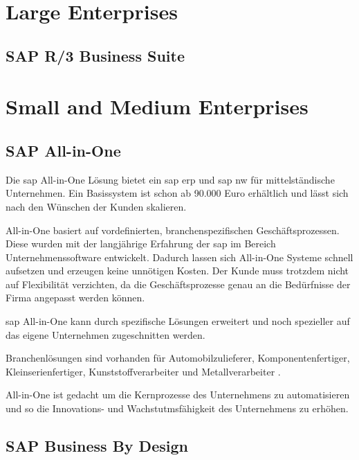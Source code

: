 \section{Large Enterprises}
\subsection{SAP R/3 Business Suite}
\label{sec:business-suite}

\section{Small and Medium Enterprises}
\subsection{SAP All-in-One}
\label{sec:allinone}

Die \gls{sap} All-in-One Lösung bietet ein \gls{sap} \gls{erp} und \gls{sap} \gls{nw} für mittelständische Unternehmen. Ein Basissystem ist schon ab 90.000 Euro erhältlich und lässt sich nach den Wünschen der Kunden skalieren.

All-in-One basiert auf vordefinierten, branchenspezifischen Geschäftsprozessen. Diese wurden mit der langjährige Erfahrung der \gls{sap} im Bereich Unternehmenssoftware entwickelt. Dadurch lassen sich All-in-One Systeme schnell aufsetzen und erzeugen keine unnötigen Kosten. Der Kunde muss trotzdem nicht auf Flexibilität verzichten, da die Geschäftsprozesse genau an die Bedürfnisse der Firma angepasst werden können.

\gls{sap} All-in-One kann durch spezifische Lösungen erweitert und noch spezieller auf das eigene Unternehmen zugeschnitten werden.

Branchenlösungen sind vorhanden für Automobilzulieferer, Komponentenfertiger, Kleinserienfertiger, Kunststoffverarbeiter und Metallverarbeiter \cite{AiOBeratung}.

All-in-One ist gedacht um die Kernprozesse des Unternehmens zu automatisieren und so die Innovations- und Wachstutmsfähigkeit des Unternehmens zu erhöhen.

\subsection{SAP Business By Design}
\label{sec:byd}

